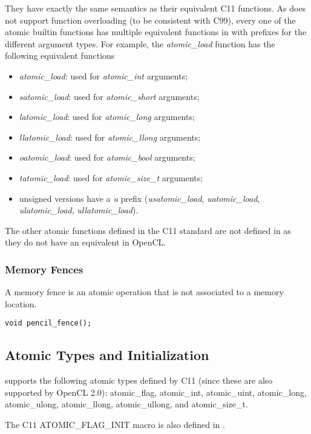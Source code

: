 They have exactly the same semantics as their equivalent C11 functions.
As \pencil does not support function overloading (to be consistent
with C99), every one of the atomic builtin functions has multiple equivalent
functions in \pencil with prefixes for the different argument types.
For example, the \emph{atomic_load} function has the following equivalent
\pencil functions
\begin{itemize}
 \item \emph{atomic_load}: used for \emph{atomic_int} arguments;
 \item \emph{satomic_load}: used for \emph{atomic_short} arguments;
 \item \emph{latomic_load}: used for \emph{atomic_long} arguments;
 \item \emph{llatomic_load}: used for \emph{atomic_llong} arguments;
 \item \emph{oatomic_load}: used for \emph{atomic_bool} arguments;
 \item \emph{tatomic_load}: used for \emph{atomic_size_t} arguments;
 \item unsigned versions have a \emph{u} prefix
 (\emph{usatomic_load}, \emph{uatomic_load}, \emph{ulatomic_load},
 \emph{ullatomic_load}).
\end{itemize}

The other atomic functions defined in the  C11 standard are not defined in
\pencil as they do not have an equivalent in OpenCL.

\subsubsection{Memory Fences}
A memory fence is an atomic operation that is not associated to a memory
location.

\lstinline!void pencil_fence();!


\subsection{Atomic Types and Initialization}
\pencil supports the following atomic types defined by C11 (since these are
also supported by OpenCL 2.0):
atomic_flag, atomic_int, atomic_uint, atomic_long, atomic_ulong, atomic_llong,
atomic_ullong, and atomic_size_t.

The C11 ATOMIC_FLAG_INIT macro is also defined in \pencil.


